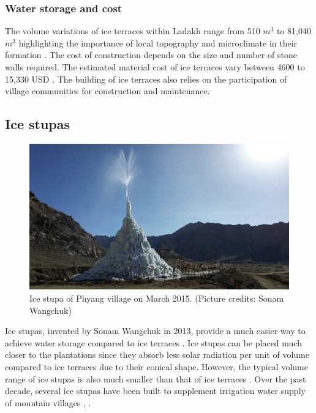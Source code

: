 \subsubsection{Water storage and cost}

The volume variations of ice terraces within Ladakh range from 510 $m^3$ to 81,040 $m^3$ highlighting
the importance of local topography and microclimate in their formation
\citep{nusserSociohydrologyArtificialGlaciers2019, norphelSnowWaterHarvesting2015}. The cost of construction
depends on the size and number of stone walls required. The estimated material cost of ice terraces vary between
4600 to 15,330 USD \citep{nusserSociohydrologyArtificialGlaciers2019}. The building of ice terraces also relies
on the participation of village communities for construction and maintenance.

\subsection{Ice stupas}

\begin{figure}[htb]
	\centering
	\includegraphics[width=\textwidth]{figs/IS_example.jpg}
	\caption{Ice stupa of Phyang village on March 2015. (Picture credits: Sonam Wangchuk)}
	\label{fig:ISexample}
\end{figure}

Ice stupas, invented by Sonam Wangchuk in 2013, provide a much easier way to achieve water storage compared to
ice terraces \citep{wangchukIceStupaArtificial2014}. Ice stupas can be placed much closer to the plantations
since they absorb less solar radiation per unit of volume compared to ice terraces due to their conical shape.
However, the typical volume range of ice stupas is also much smaller than that of ice terraces
\citep{nusserSociohydrologyArtificialGlaciers2019}. Over the past decade, several ice stupas have been built to
supplement irrigation water supply of mountain villages \citep{wangchukIceStupaCompetition2020,
palmerStoringFrozenWater2022, aggarwalAdaptationClimateChange2021}, .


